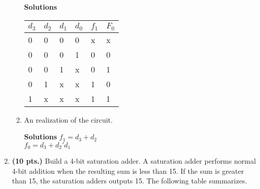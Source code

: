 \begin{enumerate}
\begin{enumerate}
                        \begin{onlysolution} \textbf{Solutions} \itshape{
                                \begin{tabular}{l|l|l|l||l|l}
                                    $d_3$ & $d_2$ & $d_1$ & $d_0$ & $f_1$ & $F_0$ \\ \hline
                                    0  &    0  &    0  &    0  &    x  &    x  \\ \hline
                                    0  &    0  &    0  &    1  &    0  &    0  \\ \hline
                                    0  &    0  &    1  &    x  &    0  &    1  \\ \hline
                                    0  &    1  &    x  &    x  &    1  &    0  \\ \hline
                                    1  &    x  &    x  &    x  &    1  &    1  \\
                                \end{tabular}
                            }
                        \end{onlysolution}

                    \item An \SOPmin realization of the circuit.
                        \begin{onlysolution} \textbf{Solutions} \itshape{
                                $f_1 = d_3 + d_2$ \\
                                $f_0 = d_3 + d_2'd_1$
                            }
                        \end{onlysolution}
                \end{enumerate}

            \item \textbf{ (10 pts.)} Build a 4-bit saturation adder.  A
                saturation adder performs normal 4-bit addition when the
                resulting sum is less than 15.  If the sum is
                greater than 15, the saturation adders outputs 15.  The
                following table summarizes.


\end{enumerate}
